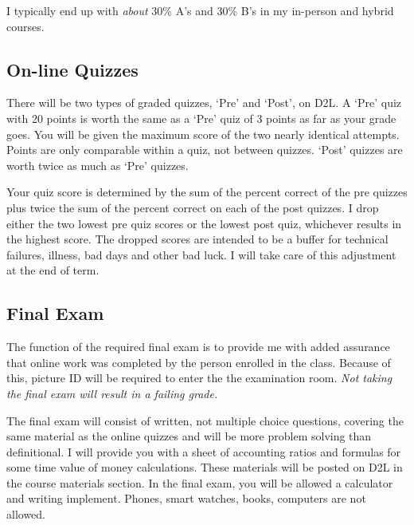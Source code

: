 \documentclass[letterpaper,10pt]{article}
\begin{document}
I typically end up with \emph{about} 30\%
A's and 30\% B's in my in-person and hybrid courses.    

\subsection{On-line Quizzes}

There will be two types of graded quizzes, `Pre' and `Post', on D2L.  A `Pre'
quiz with 20 points is worth the same as a `Pre' quiz of 3 points as
far as your grade goes.  You will be given the maximum score of the two nearly identical attempts. Points are only comparable within a quiz, not between quizzes.  `Post' quizzes are worth twice as much as `Pre' quizzes.


Your quiz score is determined by the sum of the percent correct of the pre quizzes plus twice the sum of the percent correct on each of the post quizzes. I drop either the two lowest pre quiz scores or the lowest post quiz, whichever results in the highest score. 
The dropped scores are intended to be a buffer for technical
failures, illness, bad days and other bad luck.  I will take care of this adjustment at the end of term.  

\subsection{Final Exam}


The function of the required final exam is to provide me with added assurance that online work was completed by the person enrolled in the class.  Because of this, picture ID will be required to enter the the examination room.  \emph{Not taking the final exam will result in a failing grade.}

The final exam will consist of written, not multiple choice questions, covering the same material as the online quizzes and will be more problem solving than definitional. I will provide you with a sheet of accounting ratios and formulas for some time value of money calculations.  These materials will be posted on D2L in the course materials section.  In the final exam, you will be allowed a calculator and writing implement.  Phones, smart watches, books, computers are not allowed.

\end{document}

